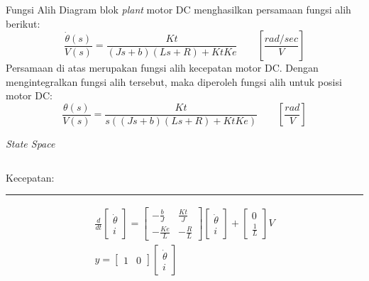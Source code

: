 \documentclass[10pt,xcolor={dvipsnames}]{beamer}
\begin{document}
		\begin{frame}{Fungsi Alih}
			Diagram blok \textit{plant} motor DC menghasilkan persamaan fungsi alih berikut:
			\begin{equation}
				\frac{\dot{\theta}(s)}{V(s)}=\frac{Kt}{(Js+b)(Ls+R)+KtKe} \qquad \left[\frac{rad/sec}{V}\right] 
			\end{equation} 
			Persamaan di atas merupakan fungsi alih kecepatan motor DC. Dengan mengintegralkan fungsi alih tersebut, maka diperoleh fungsi alih untuk posisi motor DC:
			\begin{equation}
				\frac{\theta(s)}{V(s)}=\frac{Kt}{s((Js+b)(Ls+R)+KtKe)} \qquad \left[\frac{rad}{V}\right]
				\label{position}
			\end{equation}
		\end{frame}
		
		\begin{frame}{\textit{State Space}}
			\begin{columns}[T]
				\begin{column}{0.5\textwidth}
					Kecepatan:
					\color{black}\rule{\linewidth}{4pt}
					\begin{equation}
						\begin{split}
							\frac{d}{dt}
							\begin{bmatrix}
								\dot{\theta} \\ i
							\end{bmatrix}
							=
							\begin{bmatrix}
								-\frac{b}{J} & \frac{Kt}{J}\\
								-\frac{Ke}{L} & -\frac{R}{L}
							\end{bmatrix}
							\begin{bmatrix}
								\dot{\theta} \\ i
							\end{bmatrix}
							+
							\begin{bmatrix}
								0 \\ \frac{1}{L}
							\end{bmatrix}
							V\\
							y=
							\begin{bmatrix}
								1 & 0
							\end{bmatrix}
							\begin{bmatrix}
								\dot{\theta} \\ i
							\end{bmatrix}
						\end{split}
					\end{equation}

\end{column}
\end{columns}
\end{frame}
\end{document}
